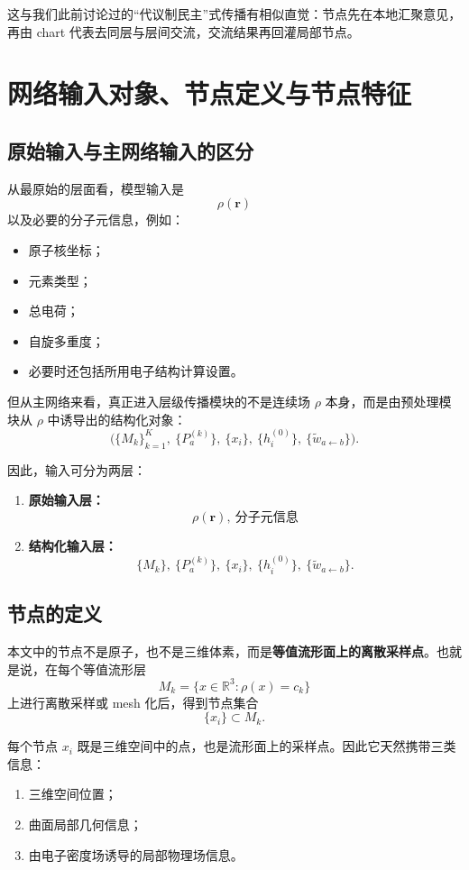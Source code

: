 \documentclass[12pt,a4paper]{ctexart}
\begin{document}
这与我们此前讨论过的“代议制民主”式传播有相似直觉：节点先在本地汇聚意见，再由 chart 代表去同层与层间交流，交流结果再回灌局部节点。

\section{网络输入对象、节点定义与节点特征}

\subsection{原始输入与主网络输入的区分}

从最原始的层面看，模型输入是
\[
\rho(\mathbf r)
\]
以及必要的分子元信息，例如：
\begin{itemize}[leftmargin=2em]
    \item 原子核坐标；
    \item 元素类型；
    \item 总电荷；
    \item 自旋多重度；
    \item 必要时还包括所用电子结构计算设置。
\end{itemize}

但从主网络来看，真正进入层级传播模块的不是连续场 \(\rho\) 本身，而是由预处理模块从 \(\rho\) 中诱导出的结构化对象：
\[
\Big(
\{M_k\}_{k=1}^{K},
\ \{P_a^{(k)}\},
\ \{x_i\},
\ \{h_i^{(0)}\},
\ \{\tilde w_{a\leftarrow b}\}
\Big).
\]

因此，输入可分为两层：

\begin{enumerate}[leftmargin=2em]
    \item \textbf{原始输入层：}
    \[
    \rho(\mathbf r),\ \text{分子元信息}
    \]
    \item \textbf{结构化输入层：}
    \[
    \{M_k\},\ \{P_a^{(k)}\},\ \{x_i\},\ \{h_i^{(0)}\},\ \{\tilde w_{a\leftarrow b}\}.
    \]
\end{enumerate}

\subsection{节点的定义}

本文中的节点不是原子，也不是三维体素，而是\textbf{等值流形面上的离散采样点}。也就是说，在每个等值流形层
\[
M_k=\{x\in\mathbb R^3:\rho(x)=c_k\}
\]
上进行离散采样或 mesh 化后，得到节点集合
\[
\{x_i\}\subset M_k.
\]

每个节点 \(x_i\) 既是三维空间中的点，也是流形面上的采样点。因此它天然携带三类信息：
\begin{enumerate}[leftmargin=2em]
    \item 三维空间位置；
    \item 曲面局部几何信息；
    \item 由电子密度场诱导的局部物理场信息。
\end{enumerate}
\end{document}
